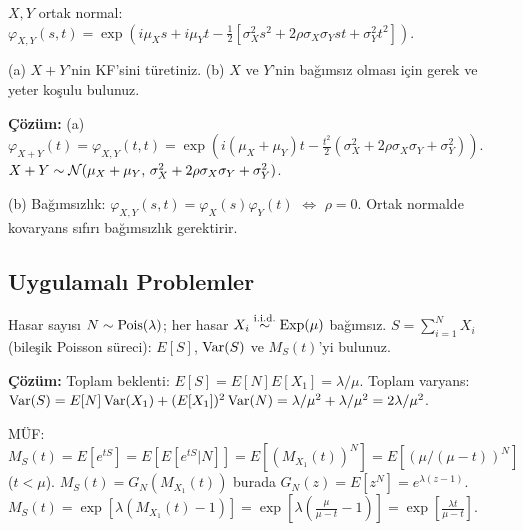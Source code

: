 \begin{ornek}
$X,Y$ ortak normal: $\varphi_{X,Y}(s,t)=\exp\!\left(i\mu_X s+i\mu_Y t-\frac{1}{2}[\sigma_X^2s^2+2\rho\sigma_X\sigma_Y st+\sigma_Y^2 t^2]\right)$.

(a) $X+Y$'nin KF'sini türetiniz.
(b) $X$ ve $Y$'nin bağımsız olması için gerek ve yeter koşulu bulunuz.

\textbf{Çözüm:}
(a) $\varphi_{X+Y}(t)=\varphi_{X,Y}(t,t)=\exp\!\left(i(\mu_X+\mu_Y)t-\frac{t^2}{2}(\sigma_X^2+2\rho\sigma_X\sigma_Y+\sigma_Y^2)\right)$.
$X+Y\sim\mathcal{N}(\mu_X+\mu_Y,\,\sigma_X^2+2\rho\sigma_X\sigma_Y+\sigma_Y^2)$.

(b) Bağımsızlık: $\varphi_{X,Y}(s,t)=\varphi_X(s)\varphi_Y(t)$ $\iff$ $\rho=0$. Ortak normalde kovaryans sıfırı bağımsızlık gerektirir.
\end{ornek}

\subsection{Uygulamalı Problemler}

\begin{ornek}
Hasar sayısı $N\sim\operatorname{Pois}(\lambda)$; her hasar $X_i\overset{\text{i.i.d.}}{\sim}\operatorname{Exp}(\mu)$ bağımsız.
$S=\sum_{i=1}^N X_i$ (bileşik Poisson süreci): $E[S]$, $\operatorname{Var}(S)$ ve $M_S(t)$'yi bulunuz.

\textbf{Çözüm:}
Toplam beklenti: $E[S]=E[N]E[X_1]=\lambda/\mu$.
Toplam varyans: $\operatorname{Var}(S)=E[N]\operatorname{Var}(X_1)+(E[X_1])^2\operatorname{Var}(N)=\lambda/\mu^2+\lambda/\mu^2=2\lambda/\mu^2$.

MÜF: $M_S(t)=E[e^{tS}]=E[E[e^{tS}|N]]=E[(M_{X_1}(t))^N]=E[(\mu/(\mu-t))^N]$ ($t<\mu$).
$M_S(t)=G_N(M_{X_1}(t))$ burada $G_N(z)=E[z^N]=e^{\lambda(z-1)}$.
$M_S(t)=\exp[\lambda(M_{X_1}(t)-1)]=\exp\!\left[\lambda\left(\frac{\mu}{\mu-t}-1\right)\right]=\exp\!\left[\frac{\lambda t}{\mu-t}\right]$.
\end{ornek}

